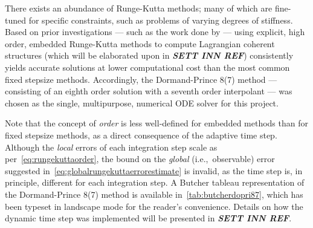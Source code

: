 

There exists an abundance of Runge-Kutta methods; many of which are fine-tuned
for specific constraints, such as problems of varying degrees of stiffness.
Based on prior investigations --- such as the work done by
\textcite{loken2017sensitivity} --- using explicit, high order, embedded
Runge-Kutta methods to compute Lagrangian coherent structures
(which will be elaborated upon in \textbf{\emph{SETT INN REF}})
consistently yields accurate solutions at lower computational cost than
the most common fixed stepsize methods. Accordingly, the Dormand-Prince 8(7)
method --- consisting of an eighth order solution with a seventh order
interpolant --- was chosen as the single, multipurpose, numerical ODE solver
for this project.

Note that the concept of \emph{order} is less well-defined for embedded
methods than for fixed stepsize methods, as a direct consequence of the
adaptive time step. Although the \emph{local} errors of each integration
step scale as per~\cref{eq:rungekuttaorder}, the bound on the \emph{global}
(i.e.,\ observable) error suggested in~\cref{eq:globalrungekuttaerrorestimate}
is invalid, as the time step is, in principle, different for each integration
step. A Butcher tableau representation of the Dormand-Prince 8(7) method
is available in~\cref{tab:butcherdopri87}, which has been typeset in
landscape mode for the reader's convenience. Details on how the dynamic
time step was implemented will be presented in \textbf{\emph{SETT INN REF}}.



